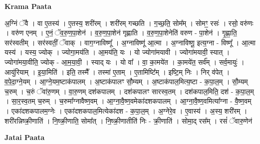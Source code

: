 \documentclass[17pt]{extarticle}
\begin{document}
\textbf{Krama Paata} \newline

अ॒ग्निं ॅवै । वा ए॒तस्य॑ । ए॒तस्य॒ शरी॑रम् । शरी॑रम् गच्छति । ग॒च्छ॒ति॒ सोम᳚म् । सोमꣳ॒॒ रसः॑ । रसो॒ वरु॑णः । वरु॑ण एनम् । ए॒नं॒ ॅव॒रु॒ण॒पा॒शेन॑ । व॒रु॒ण॒पा॒शेन॑ गृह्णाति । व॒रु॒ण॒पा॒शेनेति॑ वरुण - पा॒शेन॑ । गृ॒ह्णा॒ति॒ सर॑स्वतीम् । सर॑स्वतीं॒ ॅवाक् । वाग॒ग्नाविष्णू᳚ । अ॒ग्नाविष्णू॑ आ॒त्मा । अ॒ग्नाविष्णू॒ इत्य॒ग्ना - विष्णू᳚ । आ॒त्मा यस्य॑ । यस्य॒ ज्योक् । ज्योगा॒मय॑ति । आ॒मय॑ति॒ यः । यो ज्योगा॑मयावी । ज्योगा॑मयावी॒ स्यात् । ज्योगा॑मया॒वीति॒ ज्योक् - आ॒म॒या॒वी॒ । स्याद् यः । यो वा᳚ । वा॒ का॒मये॑त । का॒मये॑त॒ सर्व᳚म् । सर्व॒मायुः॑ । आयु॑रियाम् । इ॒या॒मिति॑ । इति॒ तस्मै᳚ । तस्मा॑ ए॒ताम् । ए॒तामिष्टि᳚म् । इष्टि॒म् निः । निर् व॑पेत् । व॒पे॒दा॒ग्ने॒यम् । आ॒ग्ने॒यम॒ष्टाक॑पालम् । अ॒ष्टाक॑पालꣳ सौ॒म्यम् । अ॒ष्टाक॑पाल॒मित्य॒ष्टा - क॒पा॒ल॒म् । सौ॒म्यम् च॒रुम् । च॒रुं ॅवा॑रु॒णम् । वा॒रु॒णम् दश॑कपालम् । दश॑कपालꣳ सारस्व॒तम् । दश॑कपाल॒मिति॒ दश॑ - क॒पा॒ल॒म् । सा॒र॒स्व॒तम् च॒रुम् । च॒रुमा᳚ग्नावैष्ण॒वम् । आ॒ग्ना॒वै॒ष्ण॒वमेका॑दशकपालम् । आ॒ग्ना॒वै॒ष्ण॒वमित्या᳚ग्ना - वै॒ष्ण॒वम् । एका॑दशकपालम॒ग्नेः । एका॑दशकपाल॒मित्येका॑दश - क॒पा॒ल॒म् । अ॒ग्नेरे॒व । ए॒वास्य॑ । अ॒स्य॒ शरी॑रम् । शरी॑रन्निष्क्री॒णाति॑ । नि॒ष्क्री॒णाति॒ सोमा᳚त् । नि॒ष्क्री॒णातीति॑ निः - क्री॒णाति॑ । सोमा॒द् रस᳚म् । रसं॑ ॅवारु॒णेन॑ \newline

\textbf{Jatai Paata} \newline
\end{document}
